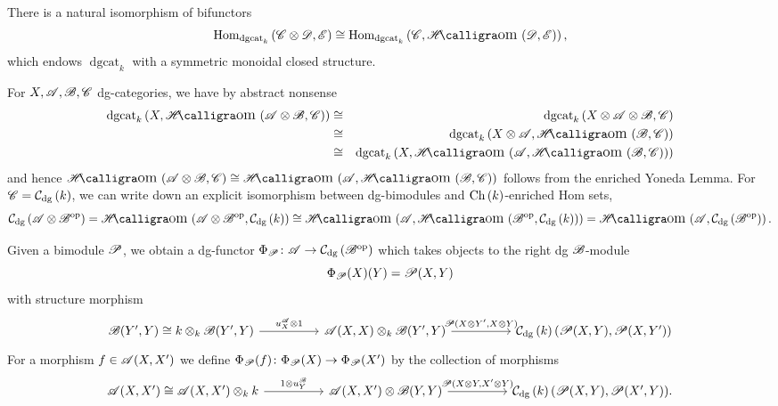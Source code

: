\documentclass[dissertation.tex]{subfiles}
\begin{document}
        \begin{rmk}
          There is a natural isomorphism of bifunctors
          $$\Hom{\operatorname{dgcat}_k}{\CC \otimes \D, \mathscr{E}} \cong \Hom{\operatorname{dgcat}_k}{\CC, \SHom{\D,\mathscr{E}}},$$
          which endows $\operatorname{dgcat}_k$ with a symmetric monoidal closed structure.
        \end{rmk}

        For $X,\mathscr{A}, \mathscr{B}, \mathscr{C}$ dg-categories, we have by abstract nonsense
        \begin{eqnarray*}
          \dgcat_k\left(X, \SHom{\A \otimes \B, \CC}\right) &\cong& \dgcat_k\left(X \otimes \A \otimes \B, \CC\right)\\
          &\cong& \dgcat_k\left(X \otimes \A, \SHom{\B, \CC}\right)\\
          &\cong& \dgcat_k\left(X, \SHom{\A,\SHom{\B, \CC}}\right)
        \end{eqnarray*}
        and hence $\SHom{\A \otimes \B, \CC} \cong \SHom{\A, \SHom{\B, \CC}}$ follows from the enriched Yoneda Lemma.
        For $\mathscr{C} = \mathcal{C}_\text{dg}\left(k\right)$, we can write down an explicit isomorphism between dg-bimodules and $\operatorname{Ch}\left(k\right)$-enriched Hom sets,
        $$\cdg{\A \otimes \B^\text{op}} = \SHom{\A \otimes \B^\text{op}, \cdg{k}} \cong \SHom{\A, \SHom{\B^\op, \cdg{k}}} = \SHom{\A,\cdg{\B^\op}}.$$
        
        Given a bimodule $\mathscr{P}$, we obtain a dg-functor $\Phi_{\mathscr{P}} \colon \mathscr{A} \to \mathcal{C}_\text{dg}\left(\mathscr{B}^\text{op}\right)$ which takes objects to the right dg $\mathscr{B}$-module 
        $$\Phi_{\mathscr{P}}(X)(Y) = \mathscr{P}(X,Y)$$
        with structure morphism
        $$\begin{tikzcd}
          \B(Y^\prime, Y) \cong k \otimes_k \B(Y^\prime, Y) \arrow{rr}{u^\A_X \otimes 1} && 
          \A(X,X) \otimes_k \B(Y^\prime, Y) \arrow{rr}{\funct{P}(X \otimes Y^\prime, X \otimes Y)} &&
          \cdg{k}(\funct{P}(X,Y), \funct{P}(X,Y^\prime))
        \end{tikzcd}$$
        For a morphism $f \in \mathscr{A}(X,X^\prime)$ we define $\Phi_{\mathscr{P}}(f) \colon \Phi_{\mathscr{P}}(X) \to \Phi_{\mathscr{P}}(X^\prime)$ by the collection of morphisms
        $$\begin{tikzcd}
          \A(X,X^\prime) \cong \A(X,X^\prime) \otimes_k k \arrow{rr}{1 \otimes u^\B_Y} && \A(X,X^\prime) \otimes \B(Y,Y) \arrow{rr}{\funct{P}(X \otimes Y, X^\prime \otimes Y)} && \cdg{k}(\funct{P}(X,Y), \funct{P}(X^\prime, Y)).
        \end{tikzcd}$$
\end{document}
